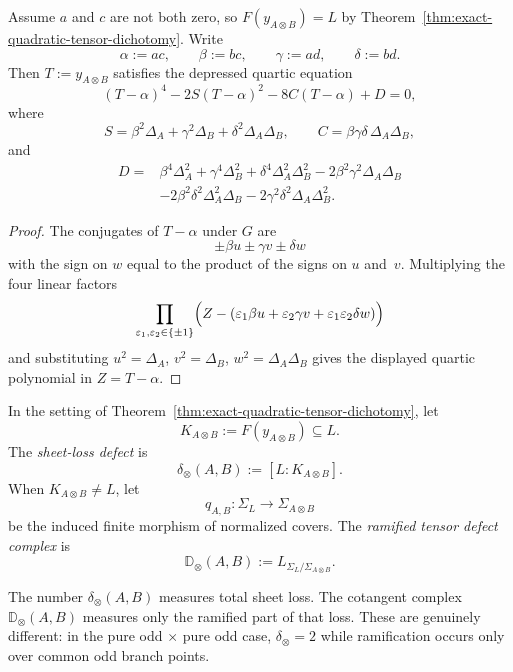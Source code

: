 \begin{computation}
\label{comp:quartic-spectral-equation}
Assume $a$ and $c$ are not both zero, so
$F(y_{A\otimes B})=L$ by
Theorem~\ref{thm:exact-quadratic-tensor-dichotomy}.
Write
\[
\alpha:=ac,
\qquad
\beta:=bc,
\qquad
\gamma:=ad,
\qquad
\delta:=bd.
\]
Then $T:=y_{A\otimes B}$ satisfies the depressed quartic equation
\[
(T-\alpha)^4-2S(T-\alpha)^2-8C(T-\alpha)+D=0,
\]
where
\[
S=\beta^2\Delta_A+\gamma^2\Delta_B+\delta^2\Delta_A\Delta_B,
\qquad
C=\beta\gamma\delta\,\Delta_A\Delta_B,
\]
and
\begin{align*}
D={}&
\beta^4\Delta_A^2
+\gamma^4\Delta_B^2
+\delta^4\Delta_A^2\Delta_B^2
-2\beta^2\gamma^2\Delta_A\Delta_B \\
&
-2\beta^2\delta^2\Delta_A^2\Delta_B
-2\gamma^2\delta^2\Delta_A\Delta_B^2.
\end{align*}
\end{computation}

\begin{proof}
The conjugates of $T-\alpha$ under $G$ are
\[
\pm\beta u\pm\gamma v\pm\delta w
\]
with the sign on $w$ equal to the product of the signs on $u$ and~$v$.
Multiplying the four linear factors
\[
\prod_{\varepsilon_1,\varepsilon_2\in\{\pm 1\}}
\Bigl(Z-(\varepsilon_1\beta u+\varepsilon_2\gamma v+
\varepsilon_1\varepsilon_2\delta w)\Bigr)
\]
and substituting $u^2=\Delta_A$, $v^2=\Delta_B$, $w^2=\Delta_A\Delta_B$ gives
the displayed quartic polynomial in $Z=T-\alpha$.
\end{proof}

\begin{definition}
\label{def:quadratic-tensor-defect-package}
In the setting of Theorem~\ref{thm:exact-quadratic-tensor-dichotomy}, let
\[
K_{A\otimes B}:=F(y_{A\otimes B})\subseteq L.
\]
The \emph{sheet-loss defect} is
\[
\delta_{\otimes}(A,B):=[L:K_{A\otimes B}].
\]
When $K_{A\otimes B}\neq L$, let
\[
q_{A,B}\colon \Sigma_L\to \Sigma_{A\otimes B}
\]
be the induced finite morphism of normalized covers.  The
\emph{ramified tensor defect complex} is
\[
\mathbb D_{\otimes}(A,B):=L_{\Sigma_L/\Sigma_{A\otimes B}}.
\]
\end{definition}

\begin{remark}
\label{rem:two-layer-necessity}
The number $\delta_{\otimes}(A,B)$ measures total sheet loss.  The cotangent
complex $\mathbb D_{\otimes}(A,B)$ measures only the ramified part of that
loss.  These are genuinely different: in the pure odd $\times$ pure odd case,
$\delta_{\otimes}=2$ while ramification occurs only over common odd branch
points.
\end{remark}

